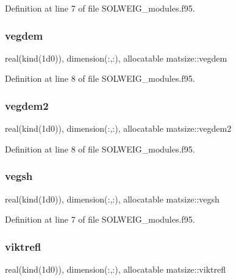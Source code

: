 Definition at line 7 of file S\+O\+L\+W\+E\+I\+G\+\_\+modules.\+f95.

\mbox{\label{namespacematsize_a0be49d58735406c79599404544199438}} 
\subsubsection{\texorpdfstring{vegdem}{vegdem}}
{\footnotesize\ttfamily real(kind(1d0)), dimension(\+:,\+:), allocatable matsize\+::vegdem}



Definition at line 8 of file S\+O\+L\+W\+E\+I\+G\+\_\+modules.\+f95.

\mbox{\label{namespacematsize_a2265584cbc20b4787247165648ac5fdc}} 
\subsubsection{\texorpdfstring{vegdem2}{vegdem2}}
{\footnotesize\ttfamily real(kind(1d0)), dimension(\+:,\+:), allocatable matsize\+::vegdem2}



Definition at line 8 of file S\+O\+L\+W\+E\+I\+G\+\_\+modules.\+f95.

\mbox{\label{namespacematsize_ae17419ca9fd6657bfc2f993e9caa074e}} 
\subsubsection{\texorpdfstring{vegsh}{vegsh}}
{\footnotesize\ttfamily real(kind(1d0)), dimension(\+:,\+:), allocatable matsize\+::vegsh}



Definition at line 7 of file S\+O\+L\+W\+E\+I\+G\+\_\+modules.\+f95.

\mbox{\label{namespacematsize_ab651f44e70ead8097cd71733bf545246}} 
\subsubsection{\texorpdfstring{viktrefl}{viktrefl}}
{\footnotesize\ttfamily real(kind(1d0)), dimension(\+:,\+:), allocatable matsize\+::viktrefl}



